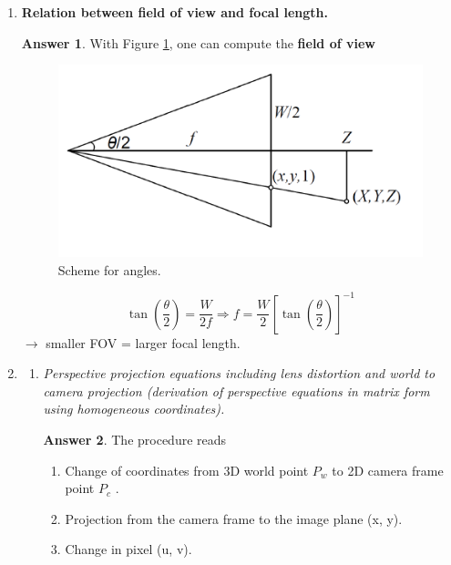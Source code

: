 \documentclass[a4paper,12 pt]{article}
\theoremstyle{definition}
\theoremstyle{remark}
\theoremstyle{definition}
\theoremstyle{definition}
\theoremstyle{definition}
\theoremstyle{definition}
\theoremstyle{remark}
\theoremstyle{remark}
\theoremstyle{definition}
\theoremstyle{definition}
\newtheorem*{answer}{Answer}
\begin{document}
\begin{enumerate}
\item \textbf{Relation between field of view and focal length.}
\begin{answer}
With Figure \ref{fig:wide}, one can compute the \textbf{field of view}
\begin{figure}[h!]
\begin{center}
\includegraphics[scale=0.5]{pics/wide}
\caption{Scheme for angles. \label{fig:wide}}
\end{center}
\end{figure}
\begin{equation}
\tan\left( \frac{\theta}{2}\right)=\frac{W}{2f} \Rightarrow f=\frac{W}{2}\left[ \tan \left( \frac{\theta}{2}\right)\right]^{-1}
\end{equation}
$\rightarrow$ smaller FOV = larger focal length.
\end{answer}
\item \begin{enumerate}
\item \textit{Perspective projection equations including lens distortion and world to camera projection (derivation of perspective equations in matrix form using homogeneous coordinates).}
\begin{answer}
The procedure reads
\begin{enumerate}
\item Change of coordinates from 3D world point $P_w$ to 2D camera frame point $P_c$  .
\item Projection from the camera frame to the image plane (x, y).
\item Change in pixel (u, v).
\end{enumerate}
\begin{figure}[h!]
\begin{center}

\end{center}
\end{figure}
\end{answer}
\end{enumerate}
\end{enumerate}
\end{document}
